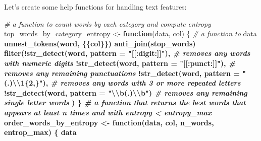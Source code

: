 \documentclass[
]{article}
\newenvironment{Shaded}{\begin{snugshade}}{\end{snugshade}}
\newcommand{\CharTok}[1]{\textcolor[rgb]{0.31,0.60,0.02}{#1}}
\newcommand{\CommentTok}[1]{\textcolor[rgb]{0.56,0.35,0.01}{\textit{#1}}}
\newcommand{\ControlFlowTok}[1]{\textcolor[rgb]{0.13,0.29,0.53}{\textbf{#1}}}
\newcommand{\DataTypeTok}[1]{\textcolor[rgb]{0.13,0.29,0.53}{#1}}
\newcommand{\KeywordTok}[1]{\textcolor[rgb]{0.13,0.29,0.53}{\textbf{#1}}}
\newcommand{\NormalTok}[1]{#1}
\newcommand{\OperatorTok}[1]{\textcolor[rgb]{0.81,0.36,0.00}{\textbf{#1}}}
\newcommand{\StringTok}[1]{\textcolor[rgb]{0.31,0.60,0.02}{#1}}
\begin{document}
Let's create some help functions for handling text features:

\begin{Shaded}
\begin{Highlighting}[]
\CommentTok{# a function to count words by each category and compute entropy}
\NormalTok{top_words_by_category_entropy <-}\StringTok{ }\ControlFlowTok{function}\NormalTok{(data, col) \{ }\CommentTok{# a function to }
\NormalTok{  data }\OperatorTok{%>%}\StringTok{ }\KeywordTok{mutate_at}\NormalTok{(\{\{col\}\}, as.character) }\OperatorTok{%>%}\StringTok{ }\KeywordTok{group_by}\NormalTok{(category) }\OperatorTok{%>%}
\StringTok{  }\KeywordTok{unnest_tokens}\NormalTok{(word, \{\{col\}\}) }\OperatorTok{%>%}
\StringTok{  }\KeywordTok{anti_join}\NormalTok{(stop_words) }\OperatorTok{%>%}
\StringTok{  }\KeywordTok{filter}\NormalTok{(}\OperatorTok{!}\KeywordTok{str_detect}\NormalTok{(word, }\DataTypeTok{pattern =} \StringTok{"[[:digit:]]"}\NormalTok{), }\CommentTok{# removes any words with numeric digits}
    \OperatorTok{!}\KeywordTok{str_detect}\NormalTok{(word, }\DataTypeTok{pattern =} \StringTok{"[[:punct:]]"}\NormalTok{),      }\CommentTok{# removes any remaining punctuations}
    \OperatorTok{!}\KeywordTok{str_detect}\NormalTok{(word, }\DataTypeTok{pattern =} \StringTok{"(.)}\CharTok{\textbackslash{}\textbackslash{}}\StringTok{1\{2,\}"}\NormalTok{),       }\CommentTok{# removes any words with 3 or more repeated letters}
    \OperatorTok{!}\KeywordTok{str_detect}\NormalTok{(word, }\DataTypeTok{pattern =} \StringTok{"}\CharTok{\textbackslash{}\textbackslash{}}\StringTok{b(.)}\CharTok{\textbackslash{}\textbackslash{}}\StringTok{b"}\NormalTok{)        }\CommentTok{# removes any remaining single letter words}
\NormalTok{  ) }\OperatorTok{%>%}\StringTok{  }\KeywordTok{count}\NormalTok{(word, }\DataTypeTok{sort =}\NormalTok{ T) }\OperatorTok{%>%}\StringTok{ }\KeywordTok{group_by}\NormalTok{(word) }\OperatorTok{%>%}\StringTok{ }\KeywordTok{mutate}\NormalTok{(}\DataTypeTok{pct =}\NormalTok{ n}\OperatorTok{/}\KeywordTok{sum}\NormalTok{(n), }\DataTypeTok{entropy =} \KeywordTok{entropy_fun}\NormalTok{(pct) , }\DataTypeTok{sum_n =} \KeywordTok{sum}\NormalTok{(n))}
\NormalTok{\}}
\CommentTok{# a function that returns the best words  that appears at least n times and with entropy < entropy_max}
\NormalTok{order_words_by_entropy <-}\StringTok{ }\ControlFlowTok{function}\NormalTok{(data, col,  n_words, entrop_max) \{}
\NormalTok{  data }\OperatorTok{%>%}\StringTok{ }\KeywordTok{filter}\NormalTok{(sum_n}\OperatorTok{>}\NormalTok{n_words,entropy}\OperatorTok{<}\NormalTok{entrop_max) }\OperatorTok{%>%}\StringTok{ }\KeywordTok{arrange}\NormalTok{(entropy) }\OperatorTok{%>%}\StringTok{ }
}}}}}
\end{Highlighting}
\end{Shaded}
\end{document}
